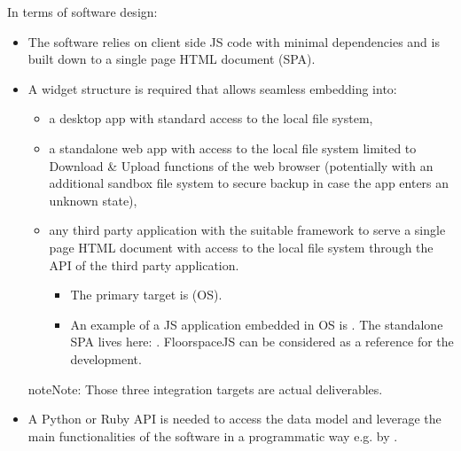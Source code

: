 \documentclass[letterpaper,10pt, openany,english]{sphinxmanual}
\begin{document}
In terms of software design:
\begin{itemize}
\item {} 
The software relies on client side JS code with minimal dependencies and is built down to a single page HTML document (SPA).

\item {} 
A widget structure is required that allows seamless embedding into:
\begin{itemize}
\item {} 
a desktop app \textendash{} with standard access to the local file system,

\item {} 
a standalone web app \textendash{} with access to the local file system limited to Download \& Upload functions of the web browser (potentially with an additional sandbox file system to secure backup in case the app enters an unknown state),

\item {} 
any third party application with the suitable framework to serve a single page HTML document \textendash{} with access to the local file system through the API of the third party application.
\begin{itemize}
\item {} 
The primary target is  (OS).

\item {} 
An example of a JS application embedded in OS is . The standalone SPA lives here: . FloorspaceJS can be considered as a reference for the development.

\end{itemize}

\end{itemize}

\begin{sphinxadmonition}{note}{Note:}
Those three integration targets are actual deliverables.
\end{sphinxadmonition}

\item {} 
A Python or Ruby API is needed to access the data model and leverage the main functionalities of the software in a programmatic way e.g. by .

\end{itemize}
\end{document}
